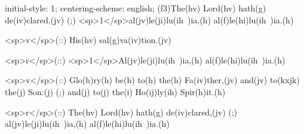 initial-style: 1;
centering-scheme: english;
(f3)The(hv) Lord(hv) hath(g) de(iv)clared,(jv) (;) <sp>1</sp>al(jv)le(ji)lu(ih~)ia,(h) al(f)le(hi)lu(ih~)ia.(h)

<sp>v</sp>(::) His(hv) sal(g)va(iv)tion.(jv)

<sp>r</sp>(::) <sp>1</sp>Al(jv)le(ji)lu(ih~)ia,(h) al(f)le(hi)lu(ih~)ia.(h)

<sp>v</sp>(::) Glo(h)ry(h) be(h) to(h) the(h) Fa(iv)ther,(jv) and(jv) to(kxjk) the(j) Son:(j) (;) and(j) to(j) the(i) Ho(ij)ly(ih) Spir(h)it.(h)

<sp>r</sp>(::) The(hv) Lord(hv) hath(g) de(iv)clared,(jv) (;) al(jv)le(ji)lu(ih~)ia,(h) al(f)le(hi)lu(ih~)ia.(h)
